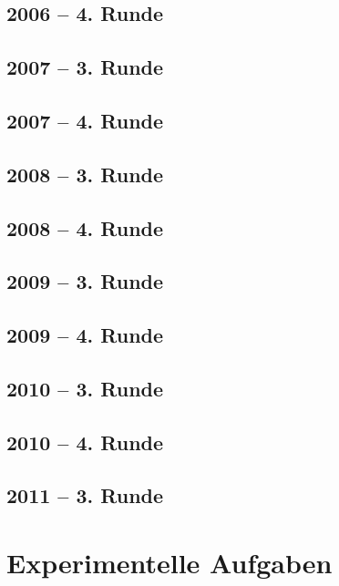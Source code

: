 \section{2006 -- 4. Runde}


\section{2007 -- 3. Runde}


\section{2007 -- 4. Runde}


\section{2008 -- 3. Runde}


\section{2008 -- 4. Runde}


\section{2009 -- 3. Runde}


\section{2009 -- 4. Runde}


\section{2010 -- 3. Runde}


\section{2010 -- 4. Runde}


\section{2011 -- 3. Runde}






\chapter{Experimentelle Aufgaben}

